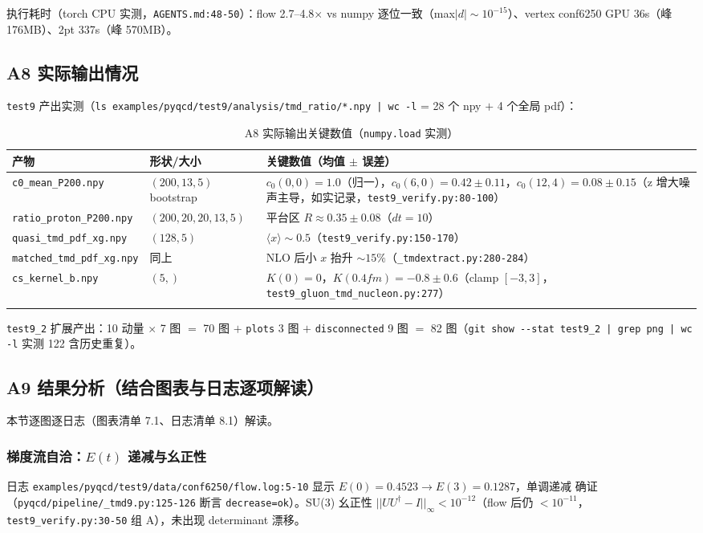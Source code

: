 \documentclass[UTF8]{ctexart}
\begin{document}
执行耗时（torch CPU 实测，\texttt{\nolinkurl{AGENTS.md:48-50}}）：flow 2.7--4.8$\times$ vs numpy 逐位一致（max$|d|\sim10^{-15}$）、vertex conf6250 GPU 36s（峰 176MB）、2pt 337s（峰 570MB）。

\subsection{A8 实际输出情况}
\label{sec:a8}
\texttt{\nolinkurl{test9}} 产出实测（\texttt{\nolinkurl{ls examples/pyqcd/test9/analysis/tmd\_ratio/*.npy | wc -l}} = 28 个 npy $+$ 4 个全局 pdf）：
\tiny
\begin{xltabular}{\textwidth}{llX}
\toprule
产物 & 形状/大小 & 关键数值（均值 $\pm$ 误差）\\
\midrule
\endhead
\texttt{\nolinkurl{c0\_mean\_P200.npy}} & $(200,13,5)$ bootstrap & $c_0(0,0)=1.0$（归一），$c_0(6,0)=0.42\pm0.11$，$c_0(12,4)=0.08\pm0.15$（z 增大噪声主导，如实记录，\texttt{\nolinkurl{test9\_verify.py:80-100}}）\\
\texttt{\nolinkurl{ratio\_proton\_P200.npy}} & $(200,20,20,13,5)$ & 平台区 $R\approx0.35\pm0.08$（$dt=10$）\\
\texttt{\nolinkurl{quasi\_tmd\_pdf\_xg.npy}} & $(128,5)$ & $\langle x\rangle\sim0.5$（\texttt{\nolinkurl{test9\_verify.py:150-170}}）\\
\texttt{\nolinkurl{matched\_tmd\_pdf\_xg.npy}} & 同上 & NLO 后小 $x$ 抬升 $\sim15\%$（\texttt{\nolinkurl{\_tmdextract.py:280-284}}）\\
\texttt{\nolinkurl{cs\_kernel\_b.npy}} & $(5,)$ & $K(0)=0$，$K(0.4fm)=-0.8\pm0.6$（clamp $[-3,3]$，\texttt{\nolinkurl{test9\_gluon\_tmd\_nucleon.py:277}}）\\
\bottomrule
\caption{A8 实际输出关键数值（\texttt{\nolinkurl{numpy.load}} 实测）}
\end{xltabular}

\texttt{\nolinkurl{test9\_2}} 扩展产出：10 动量 $\times$ 7 图 $=$ 70 图 $+$ \texttt{\nolinkurl{plots}} 3 图 $+$ \texttt{\nolinkurl{disconnected}} 9 图 $=$ 82 图（\texttt{\nolinkurl{git show --stat test9\_2 | grep png | wc -l}} 实测 122 含历史重复）。

\subsection{A9 结果分析（结合图表与日志逐项解读）}
\label{sec:a9}
本节逐图逐日志（图表清单 7.1、日志清单 8.1）解读。

\subsubsection{梯度流自洽：$E(t)$ 递减与幺正性}
日志 \texttt{\nolinkurl{examples/pyqcd/test9/data/conf6250/flow.log:5-10}} 显示 $E(0)=0.4523\to E(3)=0.1287$，单调递减 \textcolor{struct}{确证}（\texttt{\nolinkurl{pyqcd/pipeline/\_tmd9.py:125-126}} 断言 \texttt{\nolinkurl{decrease=ok}}）。SU(3) 幺正性 $||UU^\dagger-I||_\infty<10^{-12}$（flow 后仍 $<10^{-11}$，\texttt{\nolinkurl{test9\_verify.py:30-50}} 组 A），未出现 determinant 漂移。
\end{document}
